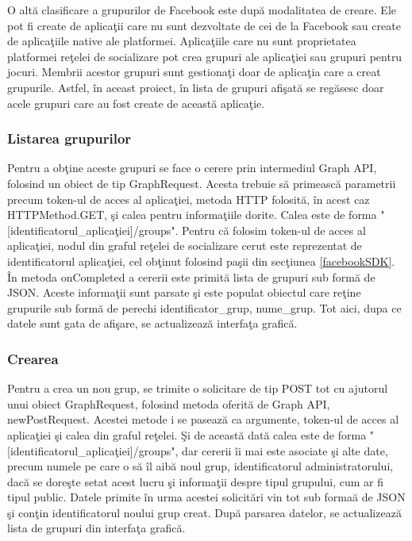 O alt\u{a} clasificare a grupurilor de Facebook este dup\u{a} modalitatea de creare. Ele pot fi create de aplica\c{t}ii care nu sunt dezvoltate de cei de la Facebook sau create de aplica\c{t}iile native ale platformei. Aplica\c{t}iile care nu sunt proprietatea platformei re\c{t}elei de socializare pot crea grupuri ale aplica\c{t}iei sau grupuri pentru jocuri. Membrii acestor grupuri sunt gestiona\c{t}i doar de aplica\c{t}ia care a creat grupurile. Astfel, \^{i}n aceast proiect, \^{i}n lista de grupuri afi\c{s}at\u{a} se reg\u{a}sesc doar acele grupuri care au fost create de aceast\u{a} aplica\c{t}ie. 

\subsubsection{Listarea grupurilor}
Pentru a ob\c{t}ine aceste grupuri se face o cerere prin intermediul Graph API, folosind un obiect de tip GraphRequest. Acesta trebuie s\u{a} primeasc\u{a} parametrii precum token-ul de acces al aplica\c{t}iei, metoda HTTP folosit\u{a}, \^{i}n acest caz HTTPMethod.GET, \c{s}i calea pentru informa\c{t}iile dorite. Calea este de forma "[identificatorul_aplica\c{t}iei]/groups". Pentru c\u{a} folosim token-ul de acces al aplica\c{t}iei, nodul din graful re\c{t}elei de socializare cerut este reprezentat de identificatorul aplica\c{t}iei, cel ob\c{t}inut folosind pa\c{s}ii din sec\c{t}iunea \ref{facebookSDK}. \^{I}n metoda onCompleted a cererii este primit\u{a} lista de grupuri sub form\u{a} de JSON. Aceste informa\c{t}ii sunt parsate \c{s}i este populat obiectul care re\c{t}ine grupurile sub form\u{a} de perechi identificator_grup, nume_grup. Tot aici, dupa ce datele sunt gata de afi\c{s}are, se actualizeaz\u{a} interfa\c{t}a grafic\u{a}.

\subsubsection{Crearea}

Pentru a crea un nou grup, se trimite o solicitare de tip POST tot cu ajutorul unui obiect GraphRequest, folosind metoda oferit\u{a} de Graph API, newPostRequest. Acestei metode i se paseaz\u{a} ca argumente, token-ul de acces al aplica\c{t}iei \c{s}i calea din graful re\c{t}elei. \c{S}i de aceast\u{a} dat\u{a} calea este de forma "[identificatorul_aplica\c{t}iei]/groups", dar cererii \^{i}i mai este asociate \c{s}i alte date, precum numele pe care o s\u{a} \^{i}l aib\u{a} noul grup, identificatorul administratorului, dac\u{a} se dore\c{s}te setat acest lucru \c{s}i informa\c{t}ii despre tipul grupului, cum ar fi tipul public. Datele primite \^{i}n urma acestei solicit\u{a}ri vin tot sub forma\u{a} de JSON \c{s}i con\c{t}in identificatorul noului grup creat. Dup\u{a} parsarea datelor, se actualizeaz\u{a} lista de grupuri din interfa\c{t}a grafic\u{a}.

